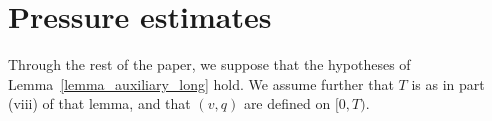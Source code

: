\documentclass[10pt,reqno]{amsart}
\theoremstyle{plain}
\theoremstyle{definition}
\newtheorem{assumption}[theorem]{Assumption}
\numberwithin{equation}{section}
\def\referee#1{{\color{green}\hbox{\bf ~#1~}}} %
\begin{document}
\section{Pressure estimates}\label{section_pressure}


Through the rest of the paper, we suppose that the hypotheses of
Lemma~\ref{lemma_auxiliary_long} hold. 
 We assume further that $T$ is as in part
(viii) of that lemma, and that $(v,q)$ are defined on $[0,T)$. 

\end{document}
